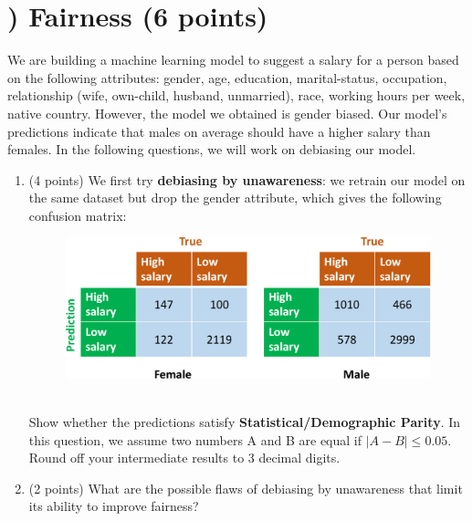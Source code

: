 \documentclass[11pt]{article}
\newcounter{QuestionCounter}
\begin{document}
\section*{) Fairness (6 points) } 
We are building a machine learning model to suggest a salary for a person based on the following attributes: gender, age, education, marital-status, occupation, relationship (wife, own-child, husband, unmarried), race, working hours per week, native country. However, the model we obtained is gender biased. Our model's predictions indicate that males on average should have a higher salary than females. In the following questions, we will work on debiasing our model.
\begin{enumerate}[(1)]
    \item (4 points) We first try \textbf{debiasing by unawareness}: we retrain our model on the same dataset but drop the gender attribute, which gives the following confusion matrix:
    \begin{figure}[h]
        \centering
        \includegraphics[width=\textwidth]{fairness_unaware.pdf}
    \end{figure} 
    \\Show whether the predictions satisfy \textbf{Statistical/Demographic Parity}. In this question, we assume two numbers A and B are equal if $|A-B|\leq0.05$. Round off your intermediate results to 3 decimal digits.\\
    \begin{answertext}{10cm}{}
   
    \end{answertext}
    
\item (2 points) What are the possible flaws of debiasing by unawareness that limit its ability to improve fairness?\\
\begin{answertext}{20cm}{}

\end{answertext}

\end{enumerate}
\end{document}
